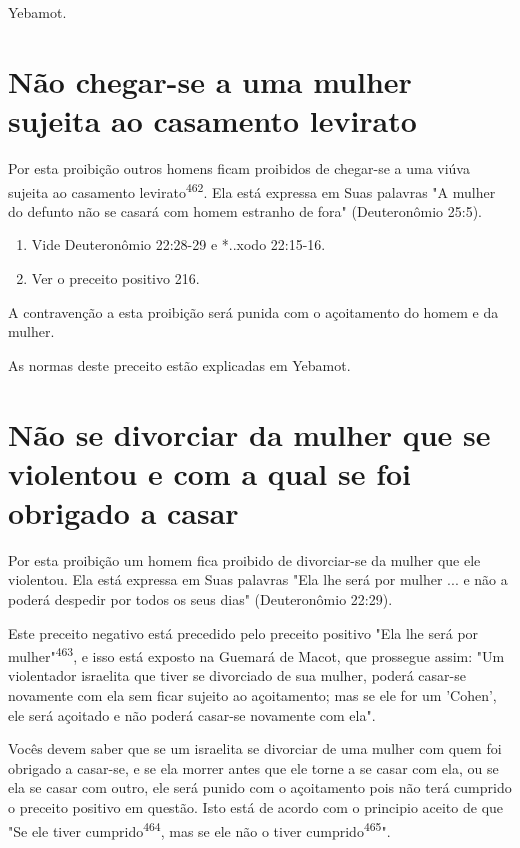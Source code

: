 Yebamot.

\section{Não chegar-se a uma mulher sujeita ao casamento levirato}

Por esta proibição outros homens ficam proibidos de chegar-se a uma
viúva sujeita ao casamento levirato\textsuperscript{462}. Ela está
expressa em Suas palavras "A mulher do defunto não se casará com homem
estranho de fora" (Deuteronô­mio 25:5).


\begin{enumerate}
\def\labelenumi{\arabic{enumi}.}
\setcounter{enumi}{460}
\item
 
 Vide Deuteronômio 22:28-29 e *..xodo 22:15-16.
 
\item
 
 Ver o preceito positivo 216.
 
\end{enumerate}



A contravenção a esta proibição será punida com o açoitamento do homem e
da mulher.

As normas deste preceito estão explicadas em Yebamot.

\section{Não se divorciar da mulher que se violentou e com a qual se foi
obrigado a casar}

Por esta proibição um homem fica proibido de divorciar-se da mu­lher que
ele violentou. Ela está expressa em Suas palavras "Ela lhe será por
mu­lher ... e não a poderá despedir por todos os seus dias"
(Deuteronômio 22:29).

Este preceito negativo está precedido pelo preceito positivo "Ela lhe
será por mulher"\textsuperscript{463}, e isso está exposto na Guemará de
Macot, que prossegue assim: "Um violentador israelita que tiver se
divorciado de sua mulher, poderá casar-se novamente com ela sem ficar
sujeito ao açoitamento; mas se ele for um 'Cohen', ele será açoitado e
não poderá casar-se novamente com ela".

Vocês devem saber que se um israelita se divorciar de uma mulher com
quem foi obrigado a casar-se, e se ela morrer antes que ele torne a se
casar com ela, ou se ela se casar com outro, ele será punido com o
açoitamento pois não terá cumprido o preceito positivo em questão. Isto
está de acordo com o principio aceito de que "Se ele tiver
cumprido\textsuperscript{464}, mas se ele não o tiver
cumprido\textsuperscript{465}".

